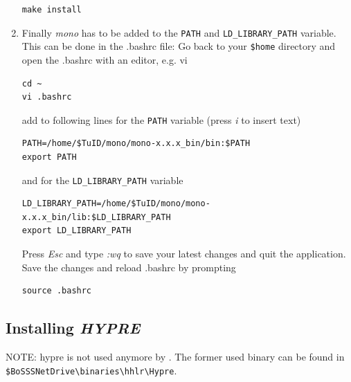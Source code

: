 \begin{enumerate}
\begin{verbatim}
make install
\end{verbatim} 
\item Finally \emph{mono} has to be added to the \verb|PATH| and \verb|LD_LIBRARY_PATH| variable. This can be done in the .bashrc file: Go back to your \verb|$home| directory and open the .bashrc with an editor, e.g. vi
\begin{verbatim}
cd ~
vi .bashrc
\end{verbatim}
add to following lines for the \verb|PATH| variable (press \emph{i} to insert text)
\begin{verbatim}
PATH=/home/$TuID/mono/mono-x.x.x_bin/bin:$PATH
export PATH
\end{verbatim}
and for the \verb|LD_LIBRARY_PATH| variable
\begin{verbatim}
LD_LIBRARY_PATH=/home/$TuID/mono/mono-x.x.x_bin/lib:$LD_LIBRARY_PATH
export LD_LIBRARY_PATH
\end{verbatim}
Press \emph{Esc} and type \emph{:wq} to save your latest changes and quit the application. Save the changes and reload .bashrc by prompting
\begin{verbatim}
source .bashrc
\end{verbatim}
\end{enumerate} 

\subsection{Installing \emph{HYPRE}}
\label{sec:hypre}
NOTE: hypre is not used anymore by \Bosss. The former used binary can be found in \verb|$BoSSSNetDrive\binaries\hhlr\Hypre|.

